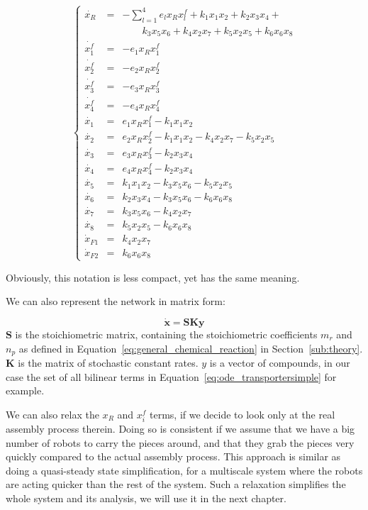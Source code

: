 	\begin{equation}
		\left\lbrace\begin{array}{lll}
			\dot{x_R} & = & -\sum_{l=1}^4 e_lx_Rx_l^f + k_1x_1x_2 + k_2x_3x_4 +  \\
			& & \qquad k_3x_5x_6 + k_4 x_2 x_7 + k_5 x_2 x_5 + k_6 x_6 x_8 \\
			\dot{x_1^f} & = & -e_1x_Rx_1^f \\
			\dot{x_2^f} & = & -e_2x_Rx_2^f \\
			\dot{x_3^f} & = & -e_3x_Rx_3^f \\
			\dot{x_4^f} & = & -e_4x_Rx_4^f \\
			\dot{x_1} & = & e_1x_Rx_1^f -k_1x_1x_2 \\
			\dot{x_2} & = & e_2x_Rx_2^f -k_1x_1x_2 -k_4x_2x_7 -k_5x_2x_5\\
			\dot{x_3} & = & e_3x_Rx_3^f -k_2x_3x_4 \\
			\dot{x_4} & = & e_4x_Rx_4^f -k_2x_3x_4 \\
			\dot{x_5} & = & k_1x_1x_2 -k_3x_5x_6 - k_5x_2x_5  \\
			\dot{x_6} & = & k_2x_3x_4 -k_3x_5x_6 - k_6x_6x_8 \\
			\dot{x_7} & = & k_3 x_5 x_6 -k_4 x_2 x_7 \\
			\dot{x_8} & = & k_5 x_2 x_5 -k_6x_6x_8 \\
			\dot{x}_{F1} & = & k_4x_2x_7 \\
			\dot{x}_{F2} & = & k_6x_6x_8 
		\end{array}\right.
		\label{eq:ode_transportersimple}
	\end{equation}
	
	Obviously, this notation is less compact, yet has the same meaning.
	
	We can also represent the network in matrix form:
	
	\[
		\mathbf{\dot{x}} = \mathbf{S} \mathbf{K} \mathbf{y}
	\]
	$\mathbf{S}$ is the stoichiometric matrix, containing the stoichiometric coefficients $m_r$ and $n_p$ as defined in Equation~\eqref{eq:general_chemical_reaction} in Section~\ref{sub:theory}. $\mathbf{K}$ is the matrix of stochastic constant rates. $y$ is a vector of compounds, in our case the set of all bilinear terms in Equation~\eqref{eq:ode_transportersimple} for example.
	
	We can also relax the $x_R$ and $x_i^f$ terms, if we decide to look only at the real assembly process therein. Doing so is consistent if we assume that we have a big number of robots to carry the pieces around, and that they grab the pieces very quickly compared to the actual assembly process. This approach is similar as doing a quasi-steady state simplification, for a multiscale system where the robots are acting quicker than the rest of the system. Such a relaxation simplifies the whole system and its analysis, we will use it in the next chapter.

